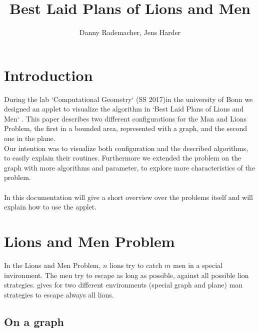 \documentclass[a4paper]{article}
\title{Best Laid Plans of Lions and Men}
\author{Danny Rademacher, Jens Harder}
\begin{document}
\maketitle


\newpage
\tableofcontents
\newpage
\section{Introduction}

During the lab `Computational Geometry` (SS 2017)in the university of Bonn we designed an applet to visualize
the algorithm in `Best Laid Plans of Lions and Men` \cite{paper}. This paper describes two different configurations for the Man and Lions Problem, the first in a bounded area, represented with a graph, and the second one in the plane.\\
Our intention was to visualize both configuration and the described algorithms, to easily explain their routines. Furthermore we extended the problem on the graph with more algorithms and parameter, to explore more characteristics of the problem.\\
\\
In this documentation will give a short overview over the problems itself and will explain how to use the applet.


\section{Lions and Men Problem}

In the Lions and Men Problem, $n$ lions try to catch $m$ men in a special invironment. The men try to escape as long as possible, against all possible lion strategies. \cite{paper} gives for two different environments (special graph and plane) man strategies to escape always all lions.

\subsection{On a graph}
\end{document}

